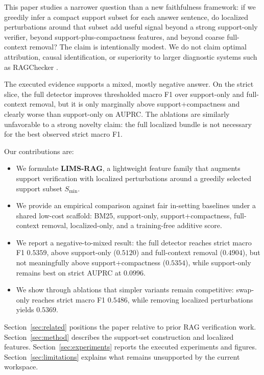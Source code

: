 \documentclass{article}
\newcommand{\smin}{S_{\mathrm{min}}}
\begin{document}
This paper studies a narrower question than a new faithfulness framework: if we greedily infer a compact support subset for each answer sentence, do localized perturbations around that subset add useful signal beyond a strong support-only verifier, beyond support-plus-compactness features, and beyond coarse full-context removal? The claim is intentionally modest. We do not claim optimal attribution, causal identification, or superiority to larger diagnostic systems such as RAGChecker \citep{ru2024ragcheckerfinegrainedframeworkdiagnosing}.

The executed evidence supports a mixed, mostly negative answer. On the strict slice, the full detector improves thresholded macro F1 over support-only and full-context removal, but it is only marginally above support+compactness and clearly worse than support-only on AUPRC. The ablations are similarly unfavorable to a strong novelty claim: the full localized bundle is not necessary for the best observed strict macro F1.

Our contributions are:
\begin{itemize}[leftmargin=1.2em]
  \item We formulate \textbf{LIMS-RAG}, a lightweight feature family that augments support verification with localized perturbations around a greedily selected support subset $\smin$.
  \item We provide an empirical comparison against fair in-setting baselines under a shared low-cost scaffold: BM25, support-only, support+compactness, full-context removal, localized-only, and a training-free additive score.
  \item We report a negative-to-mixed result: the full detector reaches strict macro F1 $0.5359$, above support-only ($0.5120$) and full-context removal ($0.4904$), but not meaningfully above support+compactness ($0.5354$), while support-only remains best on strict AUPRC at $0.0996$.
  \item We show through ablations that simpler variants remain competitive: swap-only reaches strict macro F1 $0.5486$, while removing localized perturbations yields $0.5369$.
\end{itemize}

Section~\ref{sec:related} positions the paper relative to prior RAG verification work. Section~\ref{sec:method} describes the support-set construction and localized features. Section~\ref{sec:experiments} reports the executed experiments and figures. Section~\ref{sec:limitations} explains what remains unsupported by the current workspace.
\end{document}

